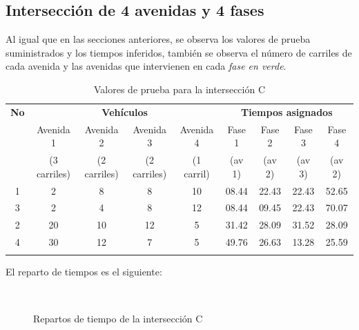 \newpage
\subsection{Intersección de 4 avenidas y 4 fases}
Al igual que en las secciones anteriores, se observa los valores de prueba suministrados y los tiempos inferidos, también se observa el número de carriles de cada avenida y las avenidas que intervienen en cada \emph{fase en verde}.

\begin{longtable}[c]{ccccccccc} \toprule
	\textbf{No} & \multicolumn{4}{c}{\textbf{Vehículos}} & \multicolumn{4}{c}{\textbf{Tiempos asignados}} \\[0.2cm]
	
	&  Avenida 1 & Avenida 2 &  Avenida 3 & Avenida 4 & Fase 1 & Fase 2 & Fase 3 & Fase 4\\[0cm]
	
	&{\scriptsize(3 carriles)}&{\scriptsize (2 carriles)}
	&{\scriptsize(2 carriles)}&{\scriptsize (1 carril)}
	&{\scriptsize (av 1)} &{\scriptsize(av 2)}
	&{\scriptsize (av 3)} &{\scriptsize(av 2)} \\[0.1cm]\midrule
	
	1 & 2 	& 8		& 8 	& 10 	& 08.44 & 22.43 & 22.43 & 52.65 \\
	3 & 2 	& 4 	& 8 	& 12 	& 08.44 & 09.45 & 22.43 & 70.07 \\
	2 & 20 	& 10 	& 12 	& 5 	& 31.42 & 28.09 & 31.52 & 28.09\\
	4 & 30 	& 12	& 7 	& 5 	& 49.76 & 26.63 & 13.28 & 25.59 \\\bottomrule
	\caption{Valores de prueba para la intersección C}
\end{longtable}

El reparto de tiempos es el siguiente:
\begin{figure}[H]
	\centering
	\\
	\caption{Repartos de tiempo de la intersección C}
\end{figure}

